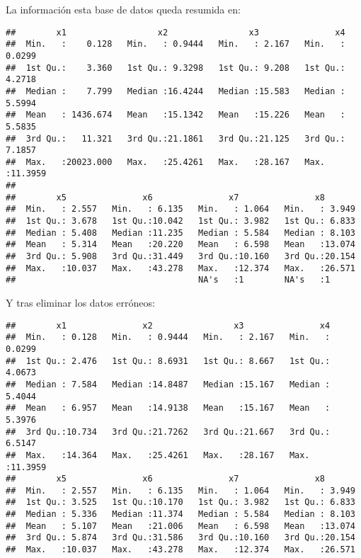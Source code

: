\documentclass[11pt,a4paper]{article}
\begin{document}
La información esta base de datos queda resumida en:
\begin{verbatim}
##        x1                  x2                x3               x4         
##  Min.   :    0.128   Min.   : 0.9444   Min.   : 2.167   Min.   : 0.0299  
##  1st Qu.:    3.360   1st Qu.: 9.3298   1st Qu.: 9.208   1st Qu.: 4.2718  
##  Median :    7.799   Median :16.4244   Median :15.583   Median : 5.5994  
##  Mean   : 1436.674   Mean   :15.1342   Mean   :15.226   Mean   : 5.5835  
##  3rd Qu.:   11.321   3rd Qu.:21.1861   3rd Qu.:21.125   3rd Qu.: 7.1857  
##  Max.   :20023.000   Max.   :25.4261   Max.   :28.167   Max.   :11.3959  
##                                                                          
##        x5               x6               x7               x8        
##  Min.   : 2.557   Min.   : 6.135   Min.   : 1.064   Min.   : 3.949  
##  1st Qu.: 3.678   1st Qu.:10.042   1st Qu.: 3.982   1st Qu.: 6.833  
##  Median : 5.408   Median :11.235   Median : 5.584   Median : 8.103  
##  Mean   : 5.314   Mean   :20.220   Mean   : 6.598   Mean   :13.074  
##  3rd Qu.: 5.908   3rd Qu.:31.449   3rd Qu.:10.160   3rd Qu.:20.154  
##  Max.   :10.037   Max.   :43.278   Max.   :12.374   Max.   :26.571  
##                                    NA's   :1        NA's   :1
\end{verbatim}

Y tras eliminar los datos erróneos:
\begin{verbatim}
##        x1               x2                x3               x4         
##  Min.   : 0.128   Min.   : 0.9444   Min.   : 2.167   Min.   : 0.0299  
##  1st Qu.: 2.476   1st Qu.: 8.6931   1st Qu.: 8.667   1st Qu.: 4.0673  
##  Median : 7.584   Median :14.8487   Median :15.167   Median : 5.4044  
##  Mean   : 6.957   Mean   :14.9138   Mean   :15.167   Mean   : 5.3976  
##  3rd Qu.:10.734   3rd Qu.:21.7262   3rd Qu.:21.667   3rd Qu.: 6.5147  
##  Max.   :14.364   Max.   :25.4261   Max.   :28.167   Max.   :11.3959  
##        x5               x6               x7               x8        
##  Min.   : 2.557   Min.   : 6.135   Min.   : 1.064   Min.   : 3.949  
##  1st Qu.: 3.525   1st Qu.:10.170   1st Qu.: 3.982   1st Qu.: 6.833  
##  Median : 5.336   Median :11.374   Median : 5.584   Median : 8.103  
##  Mean   : 5.107   Mean   :21.006   Mean   : 6.598   Mean   :13.074  
##  3rd Qu.: 5.874   3rd Qu.:31.586   3rd Qu.:10.160   3rd Qu.:20.154  
##  Max.   :10.037   Max.   :43.278   Max.   :12.374   Max.   :26.571
\end{verbatim}
\end{document}
